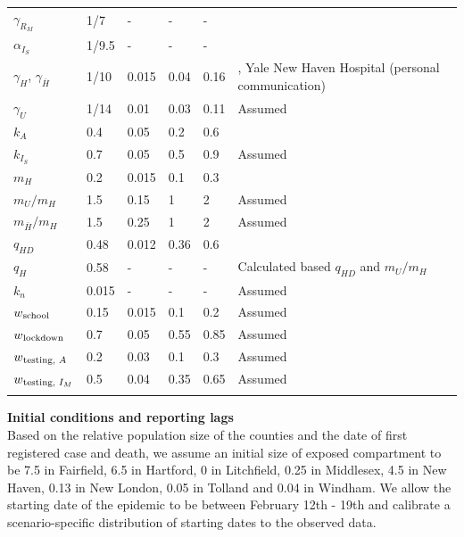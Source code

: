 \documentclass[11pt]{article}
\begin{document}
\begin{table}[!htb]
\begin{tabular}{p{} p{} p{} p{} p{} p{} }
		$\gamma_{R_M}$ & 1/7 & {-} & {-} & {-} & \citep{wolfel2020virological, cdc2020isolation} \\[0.5em]
		$\alpha_{I_S}$ & 1/9.5 & {-} & {-} & {-} & \citep{verity2020estimates, lewnard2020incidence, garg2020hospitalization, perez2020clinical} \\[0.5em]
		$\gamma_H$, $\gamma_{\bar{H}}$ & 1/10 & 0.015 & 0.04 & 0.16 & \citep{lane2020country, lewnard2020incidence, paranjpe2020clinical, gold2020characteristics}, Yale New Haven Hospital (personal communication) \\[0.5em]
		$\gamma_U$ & 1/14 & 0.01 & 0.03 & 0.11 & Assumed \\[0.5em]
		$k_A$ & 0.4 & 0.05 & 0.2 & 0.6 & \citep{salomon2020defining, ferguson2020impact} \\[0.5em]
		$k_{I_S}$ &  0.7 & 0.05 & 0.5 & 0.9 & Assumed \\[0.5em]
		$m_H$ & 0.2 & 0.015 & 0.1 & 0.3 & \citep{lane2020country, lewnard2020incidence, paranjpe2020clinical, petrilli2020factors, verity2020estimates, perez2020clinical, docherty2020features, CHAwebsite} \\[0.5em]
		$m_U / m_H$ & 1.5 & 0.15 & 1 & 2 & Assumed \\[0.5em]
		$m_{\bar{H}} / m_H$ & 1.5 & 0.25 & 1 & 2 & Assumed \\[0.5em]
		$q_{HD}$ & 0.48 & 0.012 & 0.36 & 0.6 & \citep{CHAwebsite, DPHwebsite} \\[0.5em]		
		$q_H$ & 0.58 & {-} & {-} & {-} & {Calculated based $q_{HD}$ and $m_U/m_H$} \\[0.5em]
		$k_n$ & 0.015 & {-} & {-} & {-} & Assumed \\[0.5em]
		$w\textsubscript{school}$ & 0.15 & 0.015 & 0.1 & 0.2 & Assumed \\[0.5em]
		$w\textsubscript{lockdown}$ & 0.7 & 0.05 & 0.55 & 0.85 & Assumed \\[0.5em]
		$w\textsubscript{testing, $A$}$ & 0.2 & 0.03 & 0.1 & 0.3 & Assumed \\[0.5em]
		$w\textsubscript{testing, $I_M$}$ & 0.5 & 0.04 & 0.35 & 0.65 & Assumed \\[0.5em]
		\bottomrule
	\label{table:priors}
	\end{tabular}
	\end{table}
\endgroup



\textbf{Initial conditions and reporting lags}\\[0.5em]
Based on the relative population size of the counties and the date of first registered case and death, we assume an initial size of exposed compartment to be 7.5 in Fairfield, 6.5 in Hartford, 0 in Litchfield, 0.25 in Middlesex, 4.5 in New Haven, 0.13 in New London, 0.05 in Tolland and 0.04 in Windham. We allow the starting date of the epidemic to be between February 12th - 19th and calibrate a scenario-specific distribution of starting dates to the observed data. 
\end{document}

